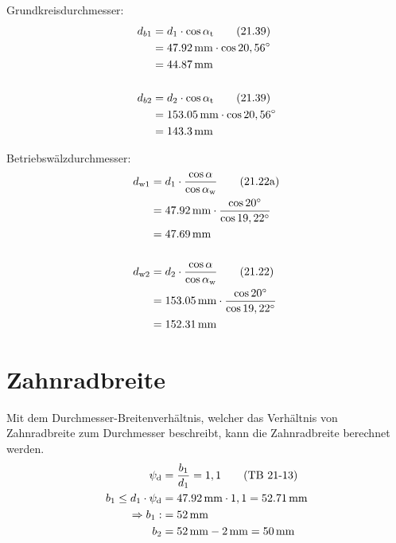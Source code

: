 \documentclass[15pt,a4paper]{article}
\begin{document}
     Grundkreisdurchmesser:
     \begin{align}
     	d_{b1}&= d_1 \cdot\cos \alpha_{\rm t} \tag{21.39}\\
     	&=\SI{47,92}{\milli\metre} \cdot\cos 20,56^\circ \notag\\
     	&=\SI{44,87}{\milli\m} \notag\\ \notag\\
     	d_{b2}&= d_2 \cdot \cos \alpha_{\rm t} \tag{21.39}\\
     	&=\SI{153,05}{\milli\metre} \cdot\cos 20,56^\circ \notag\\
     	&=\SI{143,3}{\milli\m} \notag
     \end{align}
     
     
     Betriebswälzdurchmesser:
     \begin{align}
     	d_{\rm w1}&= d_1 \cdot\frac{\cos\alpha}{\cos \alpha_{\rm w}} \tag{21.22a}\\
     	&=\SI{47,92}{\milli\metre} \cdot \frac{\cos 20^\circ}{\cos 19,22^\circ}\notag\\
     	&= \SI{47,69}{\milli\m}\notag\\\notag\\
     	d_{\rm w2}&= d_2 \cdot\frac{\cos\alpha}{\cos \alpha_{\rm w}} \tag{21.22}\\
     	&= \SI{153,05}{\milli\metre} \cdot \frac{\cos 20^\circ}{\cos 19,22^\circ}\notag\\
     	&= \SI{152,31}{\milli\m}\notag
     \end{align}
     
     \section{Zahnradbreite}
     
     Mit dem Durchmesser-Breitenverhältnis, welcher das Verhältnis von Zahnradbreite zum Durchmesser beschreibt, kann die Zahnradbreite berechnet werden. 
     \begin{align}
     	\psi_{\rm d} &= \frac{b_1}{d_1} = 1,1 \tag{TB 21-13} \\
        b_1\leq d_1 \cdot \psi_{\rm d} &= \SI{47,92}{\milli\metre} \cdot 1,1 = \SI{52,71}{\milli\m}\notag \\
     	\Rightarrow b_1 :&= \SI{52}{\milli\m} \notag\\
     	b_2&=\SI{52}{\milli\m} -\SI{2}{\milli\m}=\SI{50}{\milli\m} \notag
     \end{align}
     
     
\end{document}
